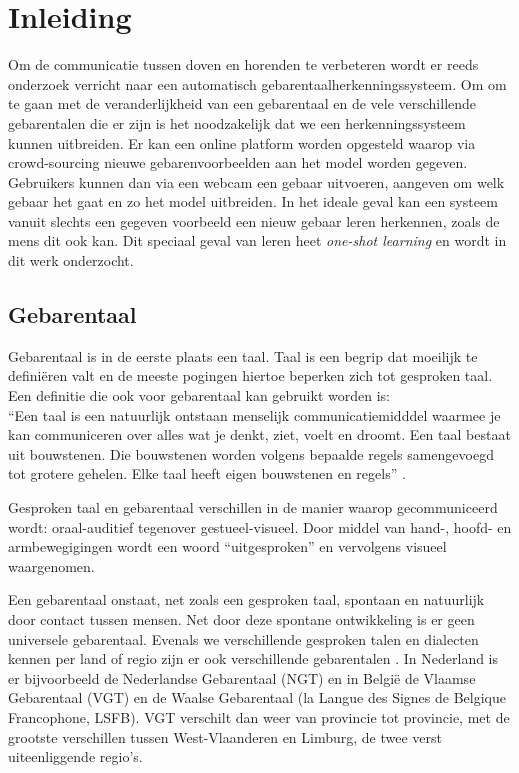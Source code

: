 \chapter{Inleiding}
Om de communicatie tussen doven en horenden te verbeteren wordt er reeds onderzoek verricht naar een automatisch gebarentaalherkenningssysteem. Om om te gaan met de veranderlijkheid van een gebarentaal en de vele verschillende gebarentalen die er zijn is het noodzakelijk dat we een herkenningssysteem kunnen uitbreiden. Er kan een online platform worden opgesteld waarop via crowd-sourcing nieuwe gebarenvoorbeelden aan het model worden gegeven. Gebruikers kunnen dan via een webcam een gebaar uitvoeren, aangeven om welk gebaar het gaat en zo het model uitbreiden.
\npar In het ideale geval kan een systeem vanuit slechts een gegeven voorbeeld een nieuw gebaar leren herkennen, zoals de mens dit ook kan. Dit speciaal geval van leren heet \textit{one-shot learning} en wordt in dit werk onderzocht.
\section{Gebarentaal}

Gebarentaal is in de eerste plaats een taal. Taal is een begrip dat moeilijk te defini\"eren valt en de meeste pogingen hiertoe beperken zich tot gesproken taal. Een definitie die ook voor gebarentaal kan gebruikt worden is: 
\\``Een taal is een natuurlijk ontstaan menselijk communicatiemidddel waarmee je kan communiceren over alles wat je denkt, ziet, voelt en droomt. Een taal bestaat uit bouwstenen. Die bouwstenen worden volgens bepaalde regels samengevoegd tot grotere gehelen. Elke taal heeft eigen bouwstenen en regels'' \cite{buyens_gebarentaaltolken_2003}.

\npar Gesproken taal en gebarentaal verschillen in de manier waarop gecommuniceerd wordt: oraal-auditief tegenover gestueel-visueel. Door middel van hand-, hoofd- en armbewegigingen wordt een woord ``uitgesproken'' en vervolgens visueel waargenomen.

\npar Een gebarentaal onstaat, net zoals een gesproken taal, spontaan en natuurlijk door contact tussen mensen. Net door deze spontane ontwikkeling is er geen universele gebarentaal. Evenals we verschillende gesproken talen en dialecten kennen per land of regio zijn er ook verschillende gebarentalen \cite{VGT-standard}. In Nederland is er bijvoorbeeld de Nederlandse Gebarentaal (NGT) en in Belgi\"e de Vlaamse Gebarentaal (VGT) en de Waalse Gebarentaal (la Langue des Signes de Belgique Francophone, LSFB). VGT verschilt dan weer van provincie tot provincie, met de grootste verschillen tussen West-Vlaanderen en Limburg, de twee verst uiteenliggende regio's.

